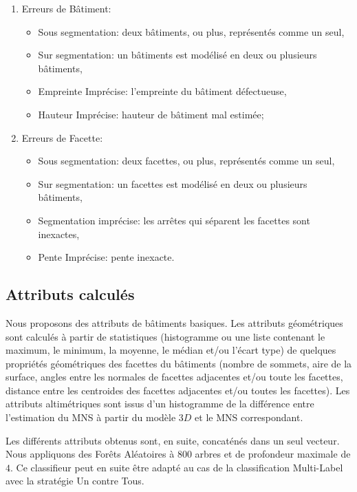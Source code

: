 \documentclass[a4paper,french]{article}
\begin{document}
    \begin{enumerate}[label= (\roman*)., itemsep=0pt]
        \item Erreurs de Bâtiment:
        \begin{itemize}[itemsep=0pt]
            \item Sous segmentation: deux bâtiments, ou plus, représentés comme un seul,
            \item Sur segmentation: un bâtiments est modélisé en deux ou plusieurs bâtiments,
            \item Empreinte Imprécise: l'empreinte du bâtiment défectueuse,
            \item Hauteur Imprécise: hauteur de bâtiment mal estimée;
        \end{itemize}
        \item Erreurs de Facette:
        \begin{itemize}[itemsep=0pt]
            \item Sous segmentation: deux facettes, ou plus, représentés comme un seul,
            \item Sur segmentation: un facettes est modélisé en deux ou plusieurs bâtiments,
            \item Segmentation imprécise: les arrêtes qui séparent les facettes sont inexactes,
            \item Pente Imprécise: pente inexacte.
        \end{itemize}
    \end{enumerate}

    \subsection{Attributs calculés}

    Nous proposons des attributs de bâtiments basiques. Les attributs géométriques sont calculés à partir de statistiques (histogramme ou une liste contenant le maximum, le minimum, la moyenne, le médian et/ou l'écart type) de quelques propriétés géométriques des facettes du bâtiments (nombre de sommets, aire de la surface, angles entre les normales de facettes adjacentes et/ou toute les facettes, distance entre les centroides des facettes adjacentes et/ou toutes les facettes). Les attributs altimétriques sont issus d'un histogramme de la différence entre l'estimation du MNS à partir du modèle $3D$ et le MNS correspondant.

    Les différents attributs obtenus sont, en suite, concaténés dans un seul vecteur. Nous appliquons des Forêts Aléatoires à $800$ arbres et de profondeur maximale de $4$. Ce classifieur peut en suite être adapté au cas de la classification Multi-Label avec la stratégie Un contre Tous.
\end{document}
